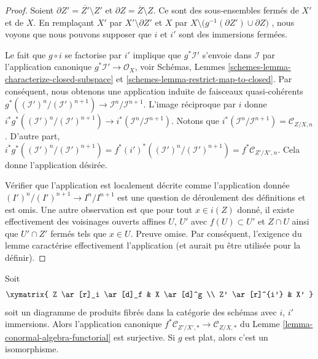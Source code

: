 \begin{proof}
Soient  $\partial Z' = \overline{Z'} \setminus Z'$  et  $\partial Z = \overline{Z} \setminus Z$. Ce sont des sous-ensembles fermés de
 $X'$  et de  $X$. En remplaçant  $X'$  par  $X' \setminus \partial Z'$  et
 $X$  par  $X \setminus \big(g^{-1}(\partial Z') \cup \partial Z\big)$ , nous voyons que nous pouvons supposer que
 $i$  et  $i'$  sont des immersions fermées.

\medskip\noindent
Le fait que  $g \circ i$  se factorise par  $i'$  implique que
 $g^*\mathcal{I}'$  s'envoie dans  $\mathcal{I}$  par l'application canonique
 $g^*\mathcal{I}' \to \mathcal{O}_X$, voir Schémas, Lemmes  \ref{schemes-lemma-characterize-closed-subspace}  et  \ref{schemes-lemma-restrict-map-to-closed}. Par conséquent,
nous obtenons une application induite de faisceaux quasi-cohérents  $g^*((\mathcal{I}')^n/(\mathcal{I}')^{n + 1}) \to
\mathcal{I}^n/\mathcal{I}^{n + 1}$.
L'image réciproque par  $i$  donne  $i^*g^*((\mathcal{I}')^n/(\mathcal{I}')^{n + 1}) \to
i^*(\mathcal{I}^n/\mathcal{I}^{n + 1})$. Notons que  $i^*(\mathcal{I}^n/\mathcal{I}^{n + 1}) = \mathcal{C}_{Z/X, n}$.
D'autre part,  $i^*g^*((\mathcal{I}')^n/(\mathcal{I}')^{n + 1}) =
f^*(i')^*((\mathcal{I}')^n/(\mathcal{I}')^{n + 1}) =
f^*\mathcal{C}_{Z'/X', n}$. Cela donne l'application désirée.

\medskip\noindent
Vérifier que l'application est localement décrite comme l'application donnée
 $(I')^n/(I')^{n + 1} \to I^n/I^{n + 1}$  est une question de déroulement des définitions et est omis. Une
autre observation est que pour tout  $x \in i(Z)$  donné, il existe effectivement
des voisinages ouverts affines  $U$,  $U'$  avec  $f(U) \subset U'$  et
 $Z \cap U$  ainsi que  $U' \cap Z'$  fermés tels que  $x \in U$. Preuve omise.
Par conséquent, l'exigence du lemme caractérise effectivement l'application (et
aurait pu être utilisée pour la définir).
\end{proof}

\begin{lemma}
\label{lemma-conormal-algebra-functorial-flat}
Soit
$$
\xymatrix{
Z \ar[r]_i \ar[d]_f & X \ar[d]^g \\
Z' \ar[r]^{i'} & X'
}
$$
soit un diagramme de produits fibrés dans la catégorie des schémas avec
 $i$,  $i'$  immersions. Alors l'application canonique  $f^*\mathcal{C}_{Z'/X', *} \to \mathcal{C}_{Z/X, *}$ 
du Lemme  \ref{lemma-conormal-algebra-functorial}  est surjective. Si  $g$  est plat, alors c'est un
isomorphisme.
\end{lemma}

